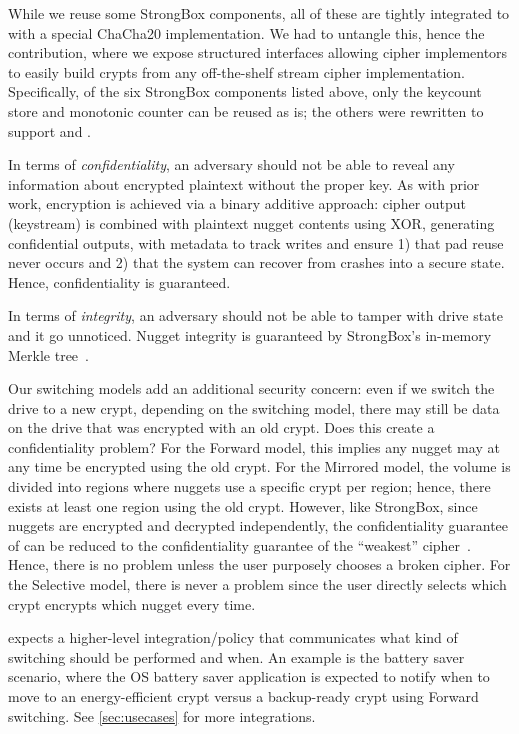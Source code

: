 While we reuse some StrongBox components, all of these are tightly integrated to
with a special ChaCha20 implementation. We had to untangle this, hence the \sysB
contribution, where we expose structured interfaces allowing cipher implementors
to easily build crypts from any off-the-shelf stream cipher implementation.
Specifically, of the six StrongBox components listed above, only the keycount
store and monotonic counter can be reused as is; the others were rewritten to
support \sysA and \sysB.


 In terms of {\em confidentiality}, an
adversary should not be able to reveal any information about encrypted plaintext
without the proper key. As with prior work, encryption is achieved via a binary
additive approach: cipher output (keystream) is combined with plaintext nugget
contents using XOR, generating confidential outputs, with metadata to track
writes and ensure 1) that pad reuse never occurs and 2) that the system can
recover from crashes into a secure state. Hence, confidentiality is guaranteed.

In terms of {\em integrity}, an adversary should not be able to tamper with
drive state and it go unnoticed. Nugget integrity is guaranteed by StrongBox's
in-memory Merkle tree~\cite{StrongBox}.

Our switching models add an additional security concern: even if we switch the
drive to a new crypt, depending on the switching model, there may still be data
on the drive that was encrypted with an old crypt. Does this create a
confidentiality problem? For the Forward model, this implies any nugget may at
any time be encrypted using the old crypt. For the Mirrored model, the volume is
divided into regions where nuggets use a specific crypt per region; hence, there
exists at least one region using the old crypt. However, like StrongBox, since
nuggets are encrypted and decrypted independently, the confidentiality guarantee
of \sys can be reduced to the confidentiality guarantee of the ``weakest''
cipher~\cite{StrongBox}. Hence, there is no problem unless the user purposely
chooses a broken cipher. For the Selective model, there is never a problem since
the user directly selects which crypt encrypts which nugget every time.

 \sys expects a higher-level integration/policy
that communicates what kind of switching should be performed and when. An
example is the battery saver scenario, where the OS battery saver application is
expected to notify \sys when to move to an energy-efficient crypt versus a
backup-ready crypt using Forward switching. See \cref{sec:usecases} for more
integrations.


